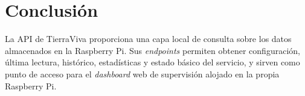 \section{Conclusión}

La API de TierraViva proporciona una capa local de consulta sobre los datos almacenados en la Raspberry Pi. Sus \textit{endpoints} permiten obtener configuración, última lectura, histórico, estadísticas y estado básico del servicio, y sirven como punto de acceso para el \textit{dashboard} web de supervisión alojado en la propia Raspberry Pi. 